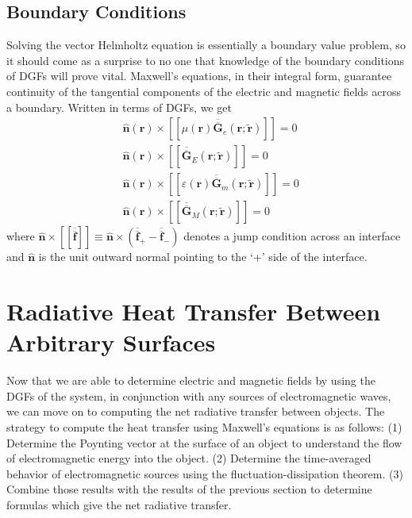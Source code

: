\subsection{Boundary Conditions}
%
Solving the vector Helmholtz equation is essentially a boundary value problem, so it should come as a surprise to no one that knowledge of the boundary conditions of DGFs will prove vital. Maxwell's equations, in their integral form, guarantee continuity of the tangential components of the electric and magnetic fields across a boundary. Written in terms of DGFs, we get
%
\begin{subequations}
\begin{align}
& \widehat{\boldsymbol{n}}(\boldsymbol{r}) \times \left[\left[ \mu(\boldsymbol{r}) \overline{\overline{\boldsymbol{G}}}_{e}(\boldsymbol{r}; \widetilde{\boldsymbol{r}}) \right]\right] = 0 \\
& \widehat{\boldsymbol{n}}(\boldsymbol{r}) \times \left[\left[ \overline{\overline{\boldsymbol{G}}}_{E}(\boldsymbol{r}; \widetilde{\boldsymbol{r}}) \right]\right] = 0 \\
& \widehat{\boldsymbol{n}}(\boldsymbol{r}) \times \left[\left[ \varepsilon(\boldsymbol{r}) \overline{\overline{\boldsymbol{G}}}_{m}(\boldsymbol{r}; \widetilde{\boldsymbol{r}}) \right]\right] = 0 \\
& \widehat{\boldsymbol{n}}(\boldsymbol{r}) \times \left[\left[ \overline{\overline{\boldsymbol{G}}}_{M}(\boldsymbol{r}; \widetilde{\boldsymbol{r}}) \right]\right] = 0
\end{align} \label{eq:DGF_BCs}
\end{subequations}
%
where $\widehat{\boldsymbol{n}} \times \left[\left[ \overline{\overline{\boldsymbol{f}}} \right]\right] \equiv \widehat{\boldsymbol{n}} \times \left( \overline{\overline{\boldsymbol{f}}}_{+} - \overline{\overline{\boldsymbol{f}}}_{-} \right)$ denotes a jump condition across an interface and $\widehat{\boldsymbol{n}}$ is the unit outward normal pointing to the `+' side of the interface.\cite{Ateshian2007, Satapathy2013}


\section{Radiative Heat Transfer Between Arbitrary Surfaces} \label{sec:NFRHT}
%
Now that we are able to determine electric and magnetic fields by using the DGFs of the system, in conjunction with any sources of electromagnetic waves, we can move on to computing the net radiative transfer between objects. The strategy to compute the heat transfer using Maxwell's equations is as follows: (1) Determine the Poynting vector at the surface of an object to understand the flow of electromagnetic energy into the object. (2) Determine the time-averaged behavior of electromagnetic sources using the fluctuation-dissipation theorem. (3) Combine those results with the results of the previous section to determine formulas which give the net radiative transfer.


